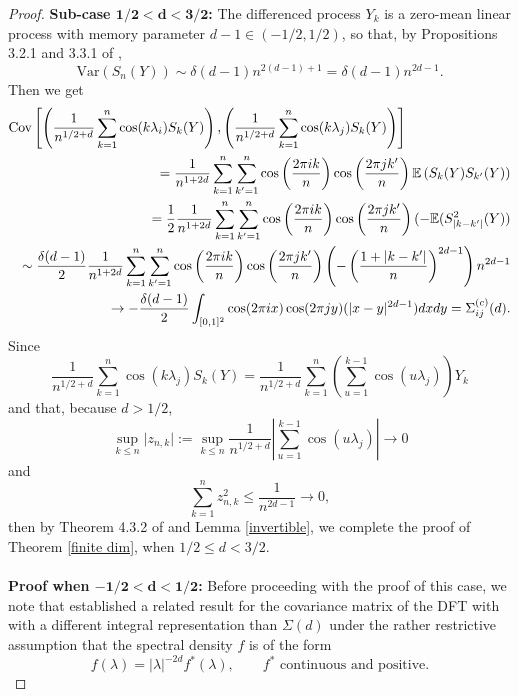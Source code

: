 \documentclass[12pt]{article}
\numberwithin{equation}{section}
\begin{document}
\begin{proof}
{\bf Sub-case $\mathbf{1/2<d<3/2}$:}  The differenced process $Y_k$ is a zero-mean linear process with memory parameter $d-1\in(-1/2,1/2)$, so that, by Propositions  3.2.1 and 3.3.1 of \cite{MR2977317},
\begin{equation}\label{giraitis stationary}
\textrm{Var}(S_n(Y))\sim\delta(d-1)n^{2(d-1)+1}=\delta(d-1) n^{2d-1}.
\end{equation}
Then we get
\begin{eqnarray}\label{cumsum}\lefteqn{
    \textrm{Cov}\left[\left(\frac{1} {n^{1/2+d}}\sum_{k=1}^n\cos(k\lambda_{i})S_k(Y)\right),\left(\frac{1}{n^{1/2+d}}\sum_{k=1}^n\cos(k\lambda_{j})S_k(Y)\right)\right]}\nonumber\\
    &&=\frac{1}{n^{1+2d}}\sum_{k=1}^n\sum_{k'=1}^n\cos\left(\frac{2\pi ik}{n}\right)\cos\left(\frac{2\pi jk'}{n}\right)\mathbb{E}\left(S_k(Y)S_{k'}(Y)\right)\nonumber\\ 
    &&=\frac{1}{2}\frac{1}{n^{1+2d}}\sum_{k=1}^n\sum_{k'=1}^n\cos\left(\frac{2\pi ik}{n}\right)\cos\left(\frac{2\pi jk'}{n}\right)(-\mathbb{E}(S^2_{\vert k-k'\vert}(Y))\nonumber\\
    &&\sim\frac{\delta(d-1)}{2}\frac{1}{n^{1+2d}}\sum_{k=1}^n\sum_{k'=1}^n\cos\left(\frac{2\pi ik}{n}\right)\cos\left(\frac{2\pi jk'}{n}\right)\left(-\left(\frac{1+\vert k-k'\vert}{n}\right)^{2d-1}\right)n^{2d-1}\nonumber\\
&&\to-\frac{\delta(d-1)}{2}\int_{[0,1]^2}\cos(2\pi ix)\cos(2\pi jy)(\vert x- y\vert^{2d-1})dxdy=\Sigma_{ij}^{(c)}(d).
\end{eqnarray}
Since 
$$
\frac{1} {n^{1/2+d}}\sum_{k=1}^n\cos(k\lambda_{j})S_k(Y)=\frac{1} {n^{1/2+d}}\sum_{k=1}^n\left(\sum_{u=1}^{k-1}\cos(u\lambda_{j})\right)Y_k
$$
and that, because $d>1/2$,
$$
\underset{k\le n}{\sup}\vert z_{n,k}\vert:=\underset{k\le n}{\sup}\frac{1} {n^{1/2+d}}\left\vert\sum_{u=1}^{k-1}\cos(u\lambda_{j})\right\vert\to0
$$
and
$$
\sum_{k=1}^nz_{n,k}^2\le\frac{1}{n^{2d-1}}\to0,
$$
then by Theorem 4.3.2 of \cite{MR2977317} and Lemma \ref{invertible},  we complete the proof of   Theorem  \ref{finite dim}, when  $1/2\le d<3/2$.\\\\
{\bf Proof when $\mathbf{-1/2<d<1/2}$:} 
Before proceeding with the proof of this case, we note that \cite{MR1243575} established a related result for the covariance matrix of the DFT with with a different integral representation than  $\Sigma(d)$ under the rather restrictive assumption that the spectral density $f$ is of the form
\[
f(\lambda)=|\lambda|^{-2d}f^*(\lambda), \qquad f^* \text{ continuous and positive}.
\]
\end{proof}
\end{document}
